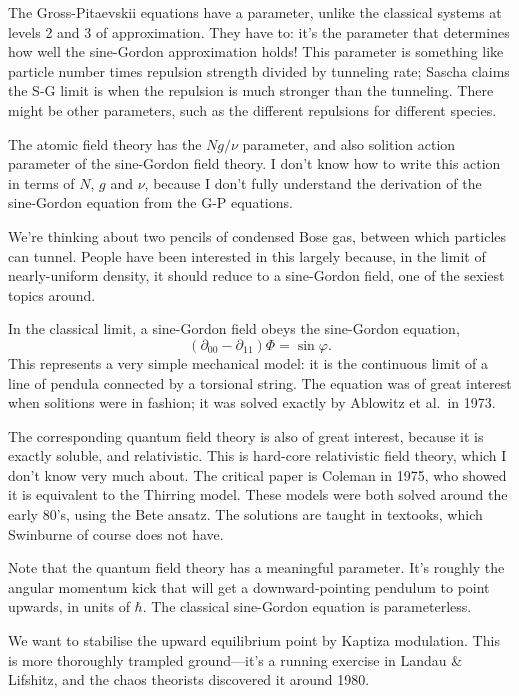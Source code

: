 The Gross-Pitaevskii equations have a parameter, unlike the classical systems at levels 2 and 3 of approximation.  They have to: it's the parameter that determines how well the sine-Gordon approximation holds!  This parameter is something like particle number times repulsion strength divided by tunneling rate; Sascha claims the S-G limit is when the repulsion is much stronger than the tunneling.  There might be other parameters, such as the different repulsions for different species.

The atomic field theory has the $Ng/ν$ parameter, and also solition action parameter of the sine-Gordon field theory.  I don't know how to write this action in terms of $N$, $g$ and $ν$, because I don't fully understand the derivation of the sine-Gordon equation from the G-P equations.

\vfil\break

We're thinking about two pencils of condensed Bose gas, between which particles can tunnel.  People have been interested in this largely because, in the limit of nearly-uniform density, it should reduce to a sine-Gordon field, one of the sexiest topics around.

In the classical limit, a sine-Gordon field obeys the sine-Gordon equation, $$(∂_{00}-∂_{11})Φ=\sin φ.$$  This represents a very simple mechanical model: it is the continuous limit of a line of pendula connected by a torsional string.  The equation was of great interest when solitions were in fashion; it was solved exactly by Ablowitz et al.\ in 1973.

The corresponding quantum field theory is also of great interest, because it is exactly soluble, and relativistic.  This is hard-core relativistic field theory, which I don't know very much about.  The critical paper is Coleman in 1975, who showed it is equivalent to the Thirring model.  These models were both solved around the early 80's, using the Bete ansatz.  The solutions are taught in textooks, which Swinburne of course does not have.

Note that the quantum field theory has a meaningful parameter.  It's roughly the angular momentum kick that will get a downward-pointing pendulum to point upwards, in units of $\hbar$.  The classical sine-Gordon equation is parameterless.

We want to stabilise the upward equilibrium point by Kaptiza modulation.  This is more thoroughly trampled ground—it's a running exercise in Landau \& Lifshitz, and the chaos theorists discovered it around 1980.

